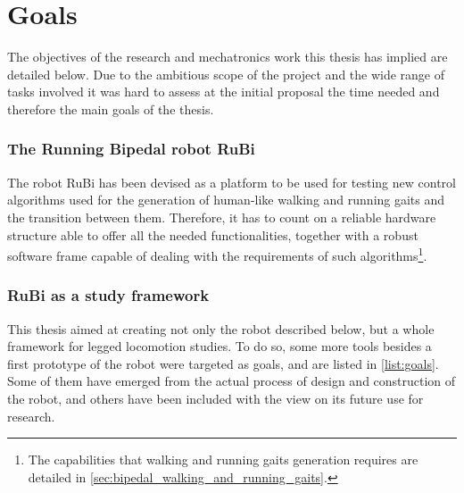 \section{Goals}
\label{sec:goals}
The objectives of the research and mechatronics work this thesis has implied are detailed below.
Due to the ambitious scope of the project and the wide range of tasks involved it was hard to assess at the initial proposal the time needed and therefore the main goals of the thesis. 

\subsubsection{The Running Bipedal robot RuBi} %
\label{ssub:the_running_bipedal_robot_rubi}
The robot RuBi has been devised as a platform to be used for testing new control algorithms used for the generation of human-like walking and running gaits and the transition between them.
Therefore, it has to count on a reliable hardware structure able to offer all the needed functionalities, together with a robust software frame capable of dealing with the requirements of such algorithms\footnote{The capabilities that walking and running gaits generation requires are detailed in \ref{sec:bipedal_walking_and_running_gaits}.}.


\subsubsection{RuBi as a study framework} %
\label{ssub:rubi_as_a_study_framework}
This thesis aimed at creating not only the robot described below, but a whole framework for legged locomotion studies.
To do so, some more tools besides a first prototype of the robot were targeted as goals, and are listed in \ref{list:goals}.
Some of them have emerged from the actual process of design and construction of the robot, and others have been included with the view on its future use for research.

